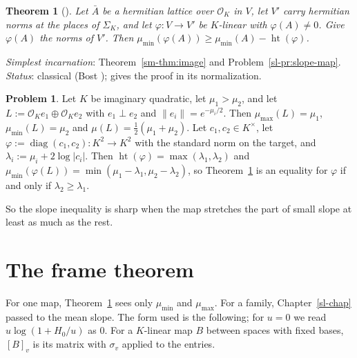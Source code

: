 \documentclass[reqno]{amsart}
\newcounter{chap}
\theoremstyle{definition}
\newtheorem{problem}{Problem}[section]
\theoremstyle{plain}
\newtheorem{theorem}{Theorem}[section]
\newcommand{\Oc}{\mathcal{O}}
\newcommand{\mumax}{\mu_{\max}}
\newcommand{\mumin}{\mu_{\min}}
\newcommand{\hgt}{\operatorname{ht}}
\begin{document}
\begin{theorem}[{\cite[Prop.~13.3]{Adr}}]\label{thm:slope}
Let \(\bar A\) be a hermitian lattice over \(\Oc_K\) in \(V\), let \(V'\) carry hermitian norms at the places of \(\Sigma_K\), and let \(\varphi \colon V \to V'\) be \(K\)-linear with \(\varphi(A) \ne 0\).  Give \(\varphi(A)\) the norms of \(V'\).  Then \(\mumin(\varphi(A)) \ge \mumin(A) - \hgt(\varphi)\).
\end{theorem}

\emph{Simplest incarnation}: Theorem~\ref{sm-thm:image} and Problem~\ref{sl-pr:slope-map}.  \emph{Status}: classical (Bost \cite{Bo1}); \cite{Adr} gives the proof in its normalization.

\begin{problem}\label{pr:diagonal}
Let \(K\) be imaginary quadratic, let \(\mu_1 > \mu_2\), and let \(L := \Oc_Ke_1 \oplus \Oc_Ke_2\) with \(e_1 \perp e_2\) and \(\lVert e_i\rVert = e^{-\mu_i/2}\).  Then \(\mumax(L) = \mu_1\), \(\mumin(L) = \mu_2\) and \(\mu(L) = \frac12(\mu_1 + \mu_2)\).  Let \(c_1, c_2 \in K^\times\), let \(\varphi := \operatorname{diag}(c_1, c_2) \colon K^2 \to K^2\) with the standard norm on the target, and \(\lambda_i := \mu_i + 2\log\lvert c_i\rvert\).  Then \(\hgt(\varphi) = \max(\lambda_1, \lambda_2)\) and \(\mumin(\varphi(L)) = \min(\mu_1 - \lambda_1, \mu_2 - \lambda_2)\), so Theorem~\ref{thm:slope} is an equality for \(\varphi\) if and only if \(\lambda_2 \ge \lambda_1\).
\end{problem}

So the slope inequality is sharp when the map stretches the part of small slope at least as much as the rest.

\section{The frame theorem}\label{sec:frame}

For one map, Theorem~\ref{thm:slope} sees only \(\mumin\) and \(\mumax\).  For a family, Chapter~\ref{sl-chap} passed to the mean slope.  The form used is the following; for \(u = 0\) we read \(u\log(1 + H_0/u)\) as \(0\).  For a \(K\)-linear map \(B\) between spaces with fixed bases, \([B]_v\) is its matrix with \(\sigma_v\) applied to the entries.
\end{document}
